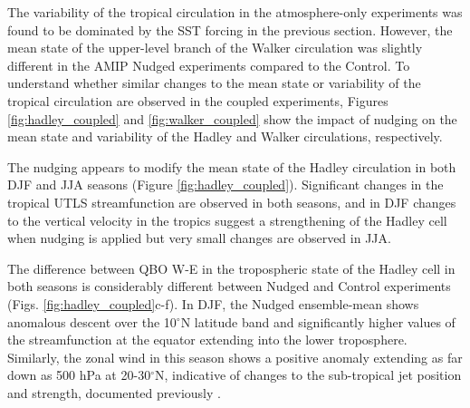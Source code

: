 The variability of the tropical circulation in the atmosphere-only experiments was found to be dominated by the SST forcing in the previous section. However, the mean state of the upper-level branch of the Walker circulation was slightly different in the AMIP Nudged experiments compared to the Control. 
To understand whether similar changes to the mean state or variability of the tropical circulation are observed in the coupled experiments, Figures \ref{fig:hadley_coupled} and \ref{fig:walker_coupled} show the impact of nudging on the mean state and variability of the Hadley and Walker circulations, respectively.

The nudging appears to modify the mean state of the Hadley circulation in both DJF and JJA seasons (Figure \ref{fig:hadley_coupled}). Significant changes in the tropical UTLS streamfunction are observed in both seasons, and in DJF changes to the vertical velocity in the tropics suggest a strengthening of the Hadley cell when nudging is applied but very small changes are observed in JJA. 


The difference between QBO W-E in the tropospheric state of the Hadley cell in both seasons is considerably different between Nudged and Control experiments (Figs. \ref{fig:hadley_coupled}c-f). 
In DJF, the Nudged ensemble-mean shows anomalous descent over the 10$^\circ$N latitude band and significantly higher values of the streamfunction at the equator extending into the lower troposphere. Similarly, the zonal wind in this season shows a positive anomaly extending as far down as 500 hPa at 20-30$^\circ$N, indicative of changes to the sub-tropical jet position and strength, documented previously \citep[e.g.][]{garfinkel2010}.

